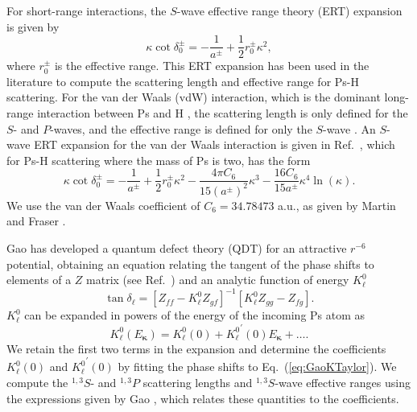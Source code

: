 \documentclass[preprint,showpacs,showkeys,preprintnumbers,amsmath,amssymb,longbibliography,pra,aps]{revtex4-1}
\begin{document}
{For short-range interactions, the $S$-wave effective range theory (ERT)
expansion is given by \cite{Bethe1949,Blatt1949}
\begin{equation}
\label{eq:EffectiveRangeShort}
\kappa \cot\delta_0^\pm = -\frac{1}{a^\pm} + \frac{1}{2} r_0^\pm \kappa^2,
\end{equation}
where $r_0^\pm$ is the effective range.
This ERT expansion has been used in the literature
\cite{Ivanov2002,VanReeth2003,Blackwood2002,Walters2004} to compute the
scattering length and effective range for Ps-H scattering. 
For the van der Waals (vdW) interaction, which is the dominant long-range
interaction between Ps and H \cite{Fabrikant2014,VanReeth2003,Au1986},
the scattering length is only defined for the $S$- and $P$-waves, and the 
effective range is defined for only the $S$-wave \cite{Levy1963}.
An $S$-wave ERT expansion for the van der Waals interaction is given in
Ref.~\cite{Drake2006}, which for Ps-H scattering where the mass of Ps
is two, has the form
\begin{equation}
\label{eq:EffectiveRangeLongAu}
\kappa \cot\delta_0^\pm = -\frac{1}{a^\pm} + \frac{1}{2} r_0^\pm \kappa^2 - 
  \frac{4 \pi C_6}{15 (a^\pm)^2} \kappa^3 - 
  \frac{16 C_6}{15 a^\pm} \kappa^4 \ln \left(\kappa \right).
\end{equation}
We use the van der Waals coefficient of $C_6 = 34.78473$ a.u., as given
by Martin and Fraser \cite{Martin1980}.

Gao \cite{Gao1998} has developed a quantum defect theory (QDT)
for an attractive $r^{-6}$ potential, obtaining an equation relating
the tangent of the phase shifts to elements of a $Z$ matrix
(see Ref.~\cite{Gao1998}) and an analytic function of energy $K_\ell^0$
\cite{Gao1998a}
\begin{equation}
\label{eq:GaoZEqn}
\tan\delta_\ell = [Z_{ff} - K_\ell^0 Z_{gf}]^{-1}
  [K_\ell^0 Z_{gg} - Z_{fg}].
\end{equation}
$K_\ell^0$ can be expanded in powers of the energy \cite{Gao1998a} of the
incoming Ps atom as
\begin{equation}
\label{eq:GaoKTaylor}
K_\ell^0(E_{\bm \kappa}) = K_\ell^0(0) + {K_\ell^0}^\prime(0) E_{\bm \kappa}
  + \ldots.
\end{equation}
We retain the first two terms in the expansion and determine the coefficients
$K_\ell^0(0)$ and ${K_\ell^0}^\prime(0)$ by fitting the phase shifts to
Eq.~(\ref{eq:GaoKTaylor}). We compute the $^{1,3}S$- and $^{1,3}P$ scattering
lengths and $^{1,3}S$-wave effective ranges using the expressions
given by Gao \cite{Gao1998a}, which relates these quantities to the
coefficients.


}
\end{document}
